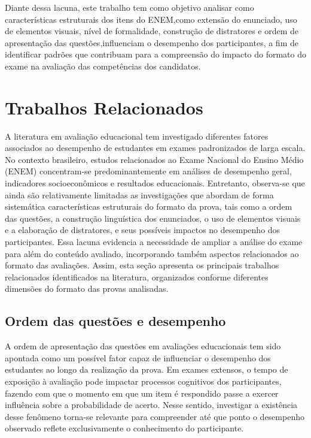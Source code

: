 \documentclass[a4paper,10pt, twocolumn]{article}
\begin{document}
Diante dessa lacuna, este trabalho tem como objetivo analisar como características estruturais dos itens do ENEM,como extensão do enunciado, uso de elementos visuais, nível de formalidade, construção de distratores e ordem de apresentação das questões,influenciam o desempenho dos participantes, a fim de identificar padrões que contribuam para a compreensão do impacto do formato do exame na avaliação das competências dos candidatos.
 
\section{Trabalhos Relacionados}

A literatura em avaliação educacional tem investigado diferentes fatores associados ao desempenho de estudantes em exames padronizados de larga escala. No contexto brasileiro, estudos relacionados ao Exame Nacional do Ensino Médio (ENEM) concentram-se predominantemente em análises de desempenho geral, indicadores socioeconômicos e resultados educacionais. Entretanto, observa-se que ainda são relativamente limitadas as investigações que abordam de forma sistemática características estruturais do formato da prova, tais como a ordem das questões, a construção linguística dos enunciados, o uso de elementos visuais e a elaboração de distratores, e seus possíveis impactos no desempenho dos participantes. Essa lacuna evidencia a necessidade de ampliar a análise do exame para além do conteúdo avaliado, incorporando também aspectos relacionados ao formato das avaliações. Assim, esta seção apresenta os principais trabalhos relacionados identificados na literatura, organizados conforme diferentes dimensões do formato das provas analisadas.

\subsection{Ordem das questões e desempenho}

A ordem de apresentação das questões em avaliações educacionais tem sido apontada como um possível fator capaz de influenciar o desempenho dos estudantes ao longo da realização da prova. Em exames extensos, o tempo de exposição à avaliação pode impactar processos cognitivos dos participantes, fazendo com que o momento em que um item é respondido passe a exercer influência sobre a probabilidade de acerto. Nesse sentido, investigar a existência desse fenômeno torna-se relevante para compreender até que ponto o desempenho observado reflete exclusivamente o conhecimento do participante.
\end{document}
